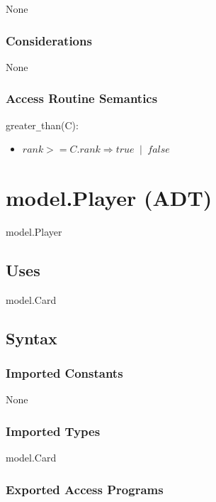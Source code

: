 \documentclass[12pt, titlepage]{article}
\begin{document}
None

\subsubsection* {Considerations}

None

\subsubsection* {Access Routine Semantics}

\noindent greater\verb|_|than(C):
\begin{itemize}
\item $rank >= C.rank \Longrightarrow true \phantom{a}|\phantom{a} false$ 

\end{itemize}

\section* {model.Player (ADT)}

model.Player

\subsection* {Uses}

model.Card

\subsection* {Syntax}

\subsubsection* {Imported Constants}

None

\subsubsection* {Imported Types}

model.Card

\subsubsection* {Exported Access Programs}
\end{document}
